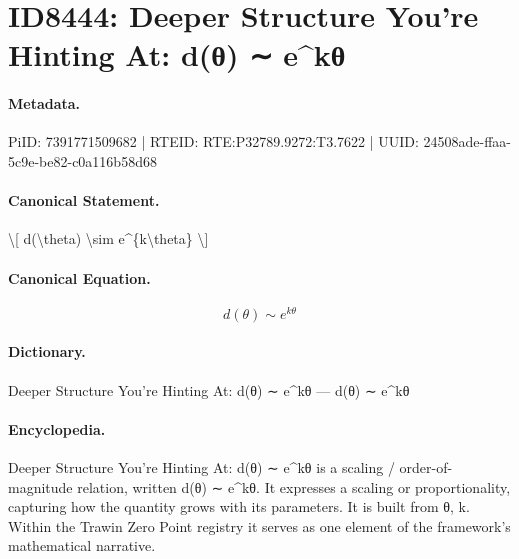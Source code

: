 \section*{ID8444: Deeper Structure You’re Hinting At: d(θ) ∼ e\textasciicircum{}kθ}
\paragraph{Metadata.}
PiID: 7391771509682 | RTEID: RTE:P32789.9272:T3.7622 | UUID: 24508ade-ffaa-5c9e-be82-c0a116b58d68

\paragraph{Canonical Statement.}
\textbackslash{}[ d(\textbackslash{}theta) \textbackslash{}sim e\textasciicircum{}\{k\textbackslash{}theta\} \textbackslash{}]

\paragraph{Canonical Equation.}
\[
d(\theta) \sim e^{k\theta}
\]

\paragraph{Dictionary.}
Deeper Structure You’re Hinting At: d(θ) ∼ e\textasciicircum{}kθ — d(θ) ∼ e\textasciicircum{}kθ

\paragraph{Encyclopedia.}
Deeper Structure You’re Hinting At: d(θ) ∼ e\textasciicircum{}kθ is a scaling / order-of-magnitude relation, written d(θ) ∼ e\textasciicircum{}kθ. It expresses a scaling or proportionality, capturing how the quantity grows with its parameters. It is built from θ, k. Within the Trawin Zero Point registry it serves as one element of the framework's mathematical narrative.
